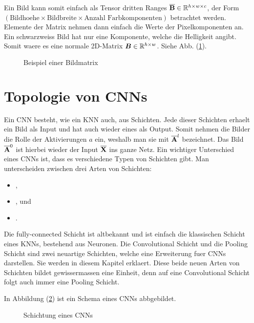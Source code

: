 \para{}
Ein Bild kann somit einfach als Tensor dritten Ranges $\ten{B} \in \set{R}^{h
  \times w \times c}$, der Form $(\text{Bildhoehe} \times \text{Bildbreite}
\times \text{Anzahl Farbkomponenten})$ betrachtet werden.
Elemente der Matrix nehmen dann einfach die Werte der Pixelkomponenten an.
Ein schwarzweiss Bild hat nur eine Komponente, welche die Helligkeit angibt.
Somit waere es eine normale 2D-Matrix $\mat{B} \in \set{R}^{h \times w}$.
Siehe Abb. (\ref{fig:bildmatrix}).
\para{}


\begin{figure}[h!]
  \begin{tikzpicture}

  \end{tikzpicture}
  \caption{Beispiel einer Bildmatrix}
  \label{fig:bildmatrix}
\end{figure}

\section{Topologie von CNNs}
Ein CNN besteht, wie ein KNN auch, aus Schichten. Jede dieser Schichten erhaelt
ein Bild als Input und hat auch wieder eines als Output. Somit nehmen die Bilder
die Rolle der Aktivierungen $a$ ein, weshalb man sie mit $\ten{A}^l$ bezeichnet.
Das Bild $\ten{A}^0$ ist hierbei wieder der Input $\ten{X}$ ins ganze Netz.
\para{}
Ein wichtiger Unterschied eines CNNs ist, dass es verschiedene Typen von
Schichten gibt. Man unterscheiden zwischen drei Arten von Schichten:
\begin{itemize}
\item{,}
\item{, und}
\item{.}
\end{itemize}
Die fully-connected Schicht ist altbekannt und ist einfach die klassischen Schicht
eines KNNs, bestehend aus Neuronen.
Die Convolutional Schicht und die Pooling Schicht sind zwei neuartige Schichten,
welche eine Erweiterung fuer CNNs darstellen. Sie werden in diesem Kapitel erklaert.
Diese beide neuen Arten von Schichten bildet gewissermassen eine Einheit, denn
auf eine Convolutional Schicht folgt auch immer eine Pooling Schicht.

\para{}
In Abbildung (\ref{fig:cnn_topology}) ist ein Schema eines CNNs abbgebildet.
\begin{figure}[h!]

  \caption{Schichtung eines CNNs}
  \label{fig:cnn_topology}
\end{figure}




